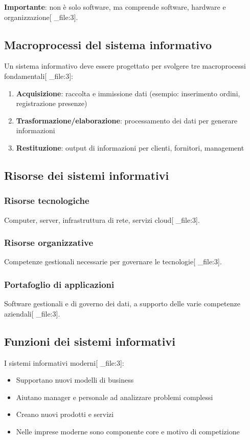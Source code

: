 \documentclass[12pt,a4paper]{article}
\begin{document}
\textbf{Importante}: non è solo software, ma comprende software, hardware e organizzazione[ _file:3].

\subsection{Macroprocessi del sistema informativo}
Un sistema informativo deve essere progettato per svolgere tre macroprocessi fondamentali[ _file:3]:

\begin{enumerate}
    \item \textbf{Acquisizione}: raccolta e immissione dati (esempio: inserimento ordini, registrazione presenze)
    \item \textbf{Trasformazione/elaborazione}: processamento dei dati per generare informazioni
    \item \textbf{Restituzione}: output di informazioni per clienti, fornitori, management
\end{enumerate}

\subsection{Risorse dei sistemi informativi}

\subsubsection{Risorse tecnologiche}
Computer, server, infrastruttura di rete, servizi cloud[ _file:3].

\subsubsection{Risorse organizzative}
Competenze gestionali necessarie per governare le tecnologie[ _file:3].

\subsubsection{Portafoglio di applicazioni}
Software gestionali e di governo dei dati, a supporto delle varie competenze aziendali[ _file:3].

\subsection{Funzioni dei sistemi informativi}
I sistemi informativi moderni[ _file:3]:
\begin{itemize}
    \item Supportano nuovi modelli di business
    \item Aiutano manager e personale ad analizzare problemi complessi
    \item Creano nuovi prodotti e servizi
    \item Nelle imprese moderne sono componente core e motivo di competizione
\end{itemize}
\end{document}
